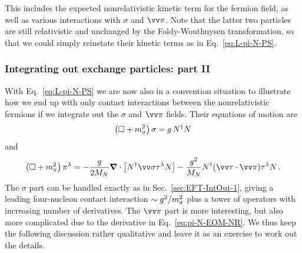 %
This includes the expected nonrelativistic kinetic term for the fermion field, 
as well as various interactions with $\sigma$ and $\skvec{\pi}$.  Note that the 
latter two particles are still relativistic and unchanged by the 
Foldy-Wouthuysen transformation, so that we could simply reinstate their 
kinetic terms as in Eq.~\eqref{eq:L-pi-N-PS}.

\subsubsection{Integrating out exchange particles: part II}
\label{sec:EFT-IntOut-2}

With Eq.~\eqref{eq:L-pi-N-PS} we are now also in a convention situation to 
illustrate how we end up with only contact interactions between the 
nonrelativistic fermions if we integrate out the $\sigma$ and $\skvec{\pi}$ 
fields.  Their equations of motion are
%
\begin{equation}
 \left(\dAlem + \msigma^2\right)\sigma = g\,N^\dagger N
\label{eq:sigma-N-EOM-NR}
\end{equation}
%
and
%
\begin{equation}
 \left(\dAlem + \mpi^2\right)\pi^\lambda
 = {-}\frac{g}{2\MN} 
 \vNabla\cdot \left[N^\dagger\skvec{\sigma}\tau^\lambda N\right]
 - \frac{g^2}{\MN}
 N^\dagger (\skvec{\tau}\cdot\skvec{\pi}) \tau^\lambda N \,.
\label{eq:pi-N-EOM-NR}
\end{equation}
%
The $\sigma$ part can be handled exactly as in Sec.~\ref{sec:EFT-IntOut-1}, 
giving a leading four-nucleon contact interaction $\sim g^2/m_\sigma^2$ plus a 
tower of operators with increasing number of derivatives.  The $\skvec{\pi}$ 
part is more interesting, but also more complicated due to the derivative in 
Eq.~\eqref{eq:pi-N-EOM-NR}.  We thus keep the following discussion rather 
qualitative and leave it as an exercise to work out the details.

